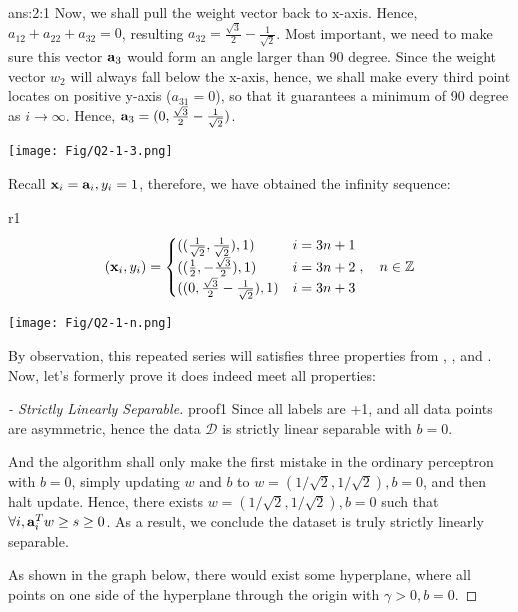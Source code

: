 \documentclass{tron}
\begin{document}
\begin{answer}{ans:2:1}
	Now, we shall pull the weight vector back to x-axis. Hence, $a_{12} + a_{22} + a_{32} = 0$, resulting $a_{32} = \frac{\sqrt{3}}{2} - \frac{1}{\sqrt{2}}$. Most important, we need to make sure this vector $\mathbf{a}_{3}$ would form an angle larger than 90 degree. Since the weight vector $w_2$ will always fall below the x-axis, hence, we shall make every third point locates on positive y-axis ($a_{31} = 0$), so that it guarantees a minimum of 90 degree as $i \rightarrow \infty$. Hence, $\mathbf{a}_{3} = (0, \frac{\sqrt{3}}{2} - \frac{1}{\sqrt{2}})$.
	
	\texttt{[image: Fig/Q2-1-3.png]}

	Recall $\mathbf{x}_i=\mathbf{a}_i, y_i = 1$, therefore, we have obtained the infinity sequence:
	\begin{remark}{r1}
	\begin{equation}
		(\mathbf{x}_{i}, y_{i}) =
		\begin{cases}
				((\frac{1}{\sqrt{2}}, \frac{1}{\sqrt{2}}), 1)  \quad & i= 3n + 1\\
				((\frac{1}{2}, -\frac{\sqrt{3}}{2}), 1) & i= 3n + 2 \\
				((0, \frac{\sqrt{3}}{2} - \frac{1}{\sqrt{2}}), 1) & i= 3n + 3
		\end{cases}
		,\quad n \in \mathbb{Z}
	\end{equation}		
	\end{remark}
	
	\texttt{[image: Fig/Q2-1-n.png]}
	
	By observation, this repeated series will satisfies three properties from , , and . Now, let's formerly prove it does indeed meet all properties:
	\begin{proof}[ - Strictly Linearly Separable]{proof1}
		Since all labels are +1, and all data points are asymmetric, hence the data $\mathcal{D}$ is strictly linear separable with $b=0$.
		
		And the algorithm shall only make the first mistake in the ordinary perceptron with $b=0$, simply updating $w$ and $b$ to $w=(1/\sqrt{2},1/\sqrt{2}), b=0$, and then halt update. Hence, there exists $w=(1/\sqrt{2},1/\sqrt{2}), b=0$ such that $\forall i, \mathbf{a}^T_i w \geq s \geq 0 $. As a result, we conclude the dataset is truly strictly linearly separable.
	
		As shown in the graph below, there would exist some hyperplane, where all points on one side of the hyperplane through the origin with $\gamma > 0, b=0$.
		

\end{proof}
\end{answer}
\end{document}
